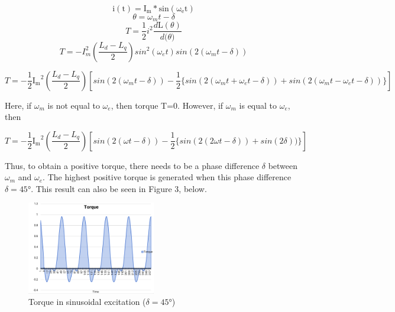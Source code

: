 \documentclass[a4paper, 11pt]{article}
\begin{document}
\begin{equation}
	\mathrm{i(t)}=\mathrm{I_m}*\mathrm{sin(\omega_e t)}
	\label{sinusoidal current}
\end{equation}
\begin{equation}
	\theta=\omega_{m}t-\delta
    \label{Torque}
\end{equation}
\begin{equation}
	T=\frac{1}{2}i^2\frac{d\mathrm L(\theta)}{d\mathrm (\theta)}
    \label{Torque}
\end{equation}
\begin{equation}
	T=-I_m^2(\frac{L_d - L_q}{2})sin^2(\omega_e t)sin(2(\omega_m t-\delta))
    \label{Torque}
\end{equation}

\begin{equation}
	T=-\frac{1}{2}\mathrm{I_m}^2(\frac{L_d - L_q}{2})[sin(2(\omega_m t-\delta))-\frac{1}{2}\{sin(2(\omega_{m}t+\omega_e t-\delta))+sin(2(\omega_{m} t-\omega_e t-\delta))\}]
    \label{Torque}
\end{equation}

Here, if $\omega_{m}$ is not equal to $\omega_e$, then torque T=0. However, if $\omega_{m}$ is equal to $\omega_e$, then

\begin{equation}
	T=-\frac{1}{2}\mathrm{I_m}^2(\frac{L_d - L_q}{2})[sin(2(\omega t-\delta))-\frac{1}{2}\{sin(2(2\omega t-\delta))+sin(2\delta))\}]
    \label{Torque}
\end{equation}

Thus, to obtain a positive torque, there needs to be a phase difference  $\delta$ between $\omega_{m}$ and $\omega_e$. The highest positive torque is generated when this phase difference $\delta=\ang{45}$. This result can also be seen in Figure 3, below.
\begin{figure}[h!]
\centering
\includegraphics[width=0.5\textwidth]{Q4-torque.png}
\caption{Torque in sinusoidal excitation ($\delta=\ang{45}$)}
\end{figure}
\end{document}
